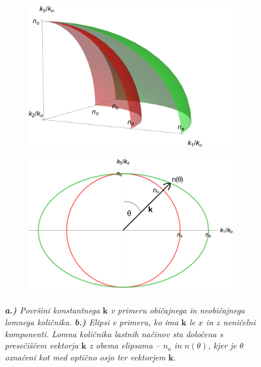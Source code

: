 \documentclass[longbibliography,slovene,a4paper,12pt]{book}
\begin{document}
\begin{figure}[h!]
	\centering
	\begin{subfigure}[b]{0.45\textwidth}
	\includegraphics[width=\textwidth]{slike/uniaxial_k_surfaces.png}
	\label{fig:uniaxialsurface3d}
	\end{subfigure}
	\begin{subfigure}[b]{0.45\textwidth}
	\includegraphics[width=\textwidth]{slike/uniaxial_k_surfaces_2d_edited.png}
	\label{fig:uniaxialsurface2d}
	\end{subfigure}
	\caption{\emph{\textbf{a.)} Površini konstantnega $\mathbf{k}$ v primeru običajnega in neobičajnega lomnega količnika. \textbf{b.)} Elipsi v primeru, ko ima $\mathbf{k}$ le $x$ in $z$ neničelni komponenti. Lomna količnika lastnih načinov sta določena s presečiščem vektorja $\mathbf{k}$ z obema elipsama -- $n_o$ in $n(\theta)$, kjer je $\theta$ označeni kot med optično osjo  ter vektorjem $\mathbf{k}$.}}
\end{figure} 
\end{document}

